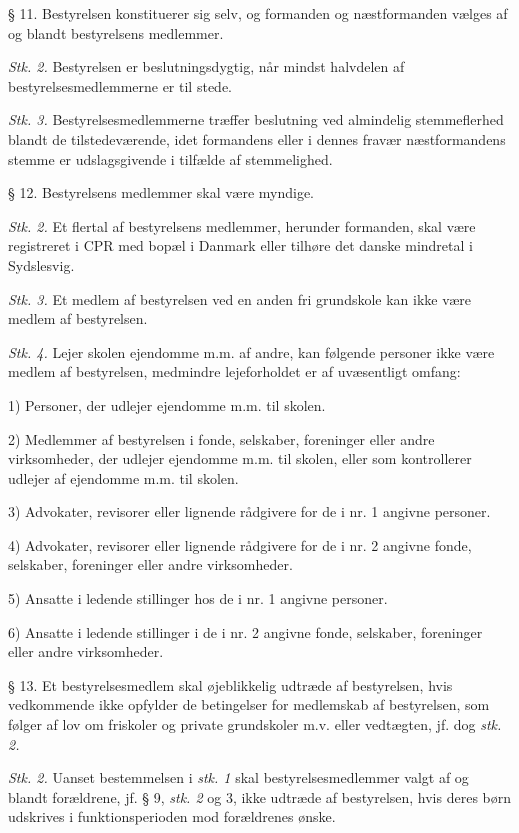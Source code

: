 \documentclass[11pt, a4paper]{article}
\begin{document}
§ 11. Bestyrelsen konstituerer sig selv, og formanden og næstformanden vælges af og blandt bestyrelsens medlemmer.

\textit{Stk. 2.} Bestyrelsen er beslutningsdygtig, når mindst halvdelen af bestyrelsesmedlemmerne er til stede.

\textit{Stk. 3.} Bestyrelsesmedlemmerne træffer beslutning ved almindelig stemmeflerhed blandt de tilstedeværende, idet formandens eller i dennes fravær næstformandens stemme er udslagsgivende i tilfælde af stemmelighed.

§ 12. Bestyrelsens medlemmer skal være myndige.

\textit{Stk. 2.} Et flertal af bestyrelsens medlemmer, herunder formanden, skal være registreret i CPR med bopæl i Danmark eller tilhøre det danske mindretal i Sydslesvig.

\textit{Stk. 3.} Et medlem af bestyrelsen ved en anden fri grundskole kan ikke være medlem af bestyrelsen.

\textit{Stk. 4.} Lejer skolen ejendomme m.m. af andre, kan følgende personer ikke være medlem af bestyrelsen, medmindre lejeforholdet er af uvæsentligt omfang:

1) Personer, der udlejer ejendomme m.m. til skolen.

2) Medlemmer af bestyrelsen i fonde, selskaber, foreninger eller andre virksomheder, der udlejer ejendomme m.m. til skolen, eller som kontrollerer udlejer af ejendomme m.m. til skolen.

3) Advokater, revisorer eller lignende rådgivere for de i nr. 1 angivne personer.

4) Advokater, revisorer eller lignende rådgivere for de i nr. 2 angivne fonde, selskaber, foreninger eller andre virksomheder.

5) Ansatte i ledende stillinger hos de i nr. 1 angivne personer.

6) Ansatte i ledende stillinger i de i nr. 2 angivne fonde, selskaber, foreninger eller andre virksomheder.

§ 13. Et bestyrelsesmedlem skal øjeblikkelig udtræde af bestyrelsen, hvis vedkommende ikke opfylder de betingelser for medlemskab af bestyrelsen, som følger af lov om friskoler og private grundskoler m.v. eller vedtægten, jf. dog \textit{stk. 2.}

\textit{Stk. 2.} Uanset bestemmelsen i \textit{stk. 1 }skal bestyrelsesmedlemmer valgt af og blandt forældrene, jf. § 9, \textit{stk. 2 }og 3, ikke udtræde af bestyrelsen, hvis deres børn udskrives i funktionsperioden mod forældrenes ønske.
\end{document}
